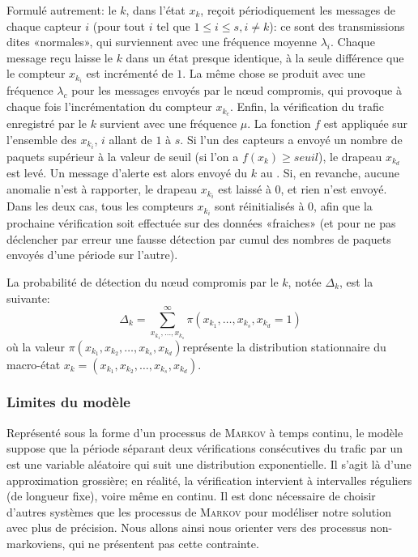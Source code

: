 Formulé autrement: le \cn $k$, dans l'état $x_k$, reçoit périodiquement les messages de chaque capteur $i$ (pour tout $i$ tel que $1\leq i\leq s, i\!\neq\!k$): ce sont des transmissions dites «normales», qui surviennent avec une fréquence moyenne $\lambda_i$.
Chaque message reçu laisse le \cn $k$ dans un état presque identique, à la seule différence que le compteur $x_{k_i}$ est incrémenté de $1$.
La même chose se produit avec une fréquence $\lambda_c$ pour les messages envoyés par le nœud compromis, qui provoque à chaque fois l'incrémentation du compteur $x_{k_c}$.
Enfin, la vérification du trafic enregistré par le \cn $k$ survient avec une fréquence $\mu$.
La fonction $f$ est appliquée sur l'ensemble des $x_{k_i}$, $i$ allant de $1$ à $s$.
Si l'un des capteurs a envoyé un nombre de paquets supérieur à la valeur de seuil (\cad si l'on a $f(x_k)\geq \mathit{seuil}$), le drapeau $x_{k_d}$ est levé.
Un message d'alerte est alors envoyé du \cn $k$ au \ch.
Si, en revanche, aucune anomalie n'est à rapporter, le drapeau $x_{k_i}$ est laissé à $0$, et rien n'est envoyé.
Dans les deux cas, tous les compteurs $x_{k_i}$ sont réinitialisés à $0$, afin que la prochaine vérification soit effectuée sur des données «fraiches» (et pour ne pas déclencher par erreur une fausse détection par cumul des nombres de paquets envoyés d'une période sur l'autre).

La probabilité de détection du nœud compromis par le \cn $k$, notée $\Delta_k$, est la suivante:
\[\Delta_k=\sum_{x_{k_1},\dots,x_{k_s}}^\infty\pi(x_{k_1},\dots,x_{k_s},x_{k_d}=1)\]
où la valeur \quad$\pi(x_{k_1},x_{k_2},\dots,x_{k_{s}},x_{k_d})$\quad représente la distribution stationnaire du macro-état $x_k\!=\!(x_{k_1},x_{k_2},\dots,x_{k_{s}},x_{k_d})$.

        \subsubsection{Limites du modèle}
Représenté sous la forme d'un processus de \textsc{Markov} à temps continu, le modèle suppose que la période séparant deux vérifications consécutives du trafic par un \cn est une variable aléatoire qui suit une distribution exponentielle.
Il s'agit là d'une approximation grossière; en réalité, la vérification intervient à intervalles réguliers (de longueur fixe), voire même en continu.
Il est donc nécessaire de choisir d'autres systèmes que les processus de \textsc{Markov} pour modéliser notre solution avec plus de précision.
Nous allons ainsi nous orienter vers des processus non-markoviens, qui ne présentent pas cette contrainte.

